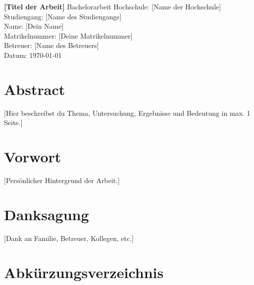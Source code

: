 \documentclass[a4paper,12pt]{article}
\begin{document}
\begin{titlepage}
    \centering
    \vspace*{1cm}
    {\huge \textbf{[Titel der Arbeit]}}
    \vspace{0.5cm}
    \newline
    {\Large Bachelorarbeit}
    \vspace{1cm}
    \newline
    Hochschule: [Name der Hochschule]\\
    Studiengang: [Name des Studiengangs]\\
    Name: [Dein Name]\\
    Matrikelnummer: [Deine Matrikelnummer]\\
    Betreuer: [Name des Betreuers]\\
    Datum: \today
\end{titlepage}

\section*{Abstract}
[Hier beschreibst du Thema, Untersuchung, Ergebnisse und Bedeutung in max. 1 Seite.]

\section*{Vorwort}
[Persönlicher Hintergrund der Arbeit.]

\section*{Danksagung}
[Dank an Familie, Betreuer, Kollegen, etc.]

\tableofcontents
\clearpage

\listoffigures
\clearpage

\listoftables
\clearpage

\section*{Abkürzungsverzeichnis}
\begin{acronym}[API]
\end{acronym}
\clearpage
\end{document}
